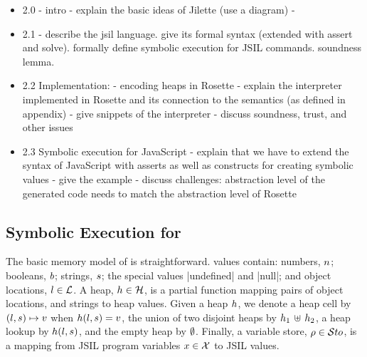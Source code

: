 
\begin{itemize}
  \item 2.0  - intro - explain the basic ideas of Jilette (use a diagram) - 
 
  \item 2.1 - describe the jsil language. give its formal syntax (extended with assert and solve). 
                   formally define symbolic execution for JSIL commands. soundness lemma. 
 
  \item 2.2 Implementation:  
               - encoding \jsil heaps in Rosette 
               - explain the \jsil interpreter implemented in Rosette and its connection to the \jsil semantics (as defined in appendix) 
               - give snippets of the interpreter 
               - discuss soundness, trust, and other issues
 
  \item 2.3 Symbolic execution for JavaScript 
              - explain that we have to extend the syntax of JavaScript with asserts  as well as constructs for creating symbolic values
              - give the example 
              - discuss challenges: abstraction level of the generated code needs to match the abstraction level of Rosette 
\end{itemize}

\subsection{Symbolic Execution for  \jsil}

The basic memory model of \jsil is straightforward. 
\jsil values contain: numbers, $n$; booleans, $b$; strings, $s$;  the special values \jsinline|undefined| and \jsinline|null|; and object locations,  $l \in {\mathcal L}$.
A \jsil heap, $h \in {\mathcal H}$, is a partial function mapping pairs of  object locations, and strings to heap values. 
 Given a heap $h$, we denote a heap cell by $(l, s) \mapsto v$ when $h(l,s) = v$, the union of two disjoint heaps by $h_1 \, \uplus \, h_2$,  a heap lookup by $h(l, s)$, and the empty heap by $\emptyset$.
 Finally, a \jsil variable store, $\rho \in \mathcal{S}to$, is a mapping from JSIL program variables $x \in \mathcal{X}$ to JSIL values.


